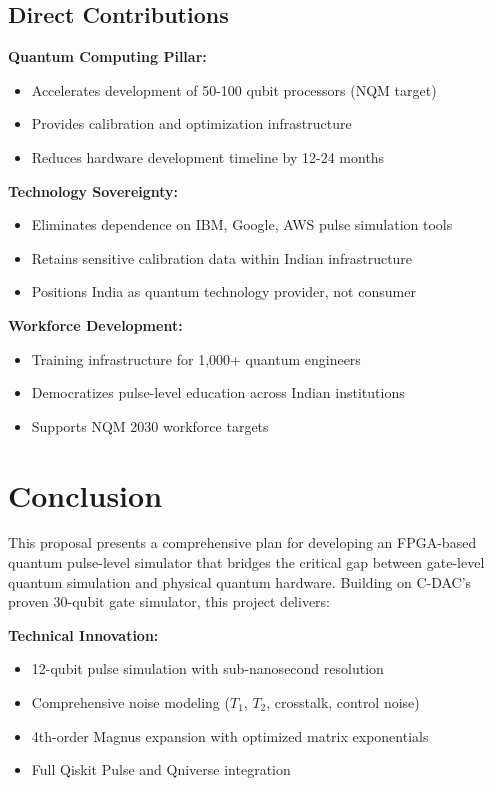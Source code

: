 \documentclass[12pt,a4paper]{article}
\begin{document}
\subsection{Direct Contributions}

\textbf{Quantum Computing Pillar:}
\begin{itemize}[noitemsep]
    \item Accelerates development of 50-100 qubit processors (NQM target)
    \item Provides calibration and optimization infrastructure
    \item Reduces hardware development timeline by 12-24 months
\end{itemize}

\textbf{Technology Sovereignty:}
\begin{itemize}[noitemsep]
    \item Eliminates dependence on IBM, Google, AWS pulse simulation tools
    \item Retains sensitive calibration data within Indian infrastructure
    \item Positions India as quantum technology provider, not consumer
\end{itemize}

\textbf{Workforce Development:}
\begin{itemize}[noitemsep]
    \item Training infrastructure for 1,000+ quantum engineers
    \item Democratizes pulse-level education across Indian institutions
    \item Supports NQM 2030 workforce targets
\end{itemize}

\newpage
\section{Conclusion}

This proposal presents a comprehensive plan for developing an FPGA-based quantum pulse-level simulator that bridges the critical gap between gate-level quantum simulation and physical quantum hardware. Building on C-DAC's proven 30-qubit gate simulator, this project delivers:

\textbf{Technical Innovation:}
\begin{itemize}[noitemsep]
    \item 12-qubit pulse simulation with sub-nanosecond resolution
    \item Comprehensive noise modeling ($T_1$, $T_2$, crosstalk, control noise)
    \item 4th-order Magnus expansion with optimized matrix exponentials
    \item Full Qiskit Pulse and Qniverse integration
\end{itemize}
\end{document}
